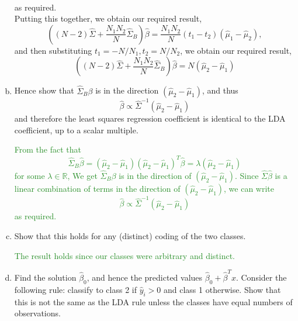 \documentclass{article}
\begin{document}
\begin{enumerate}[(a)]
{\begin{align*}
            \end{align*} as required.\\
            Putting this together, we obtain our required result, \[
                \left( (N-2) \hat \Sigma + \frac{N_1 N_2}{N} \hat \Sigma_B \right) \hat \beta = \frac{N_1 N_2}{N} (t_1 - t_2)(\hat \mu_1 - \hat \mu_2),
            \]
            and then substituting $t_1 = -N/N_1, t_2 = N/N_2$, we obtain our required result, \[
                \left( (N-2) \hat \Sigma + \frac{N_1 N_2}{N} \hat \Sigma_B \right) \hat \beta = N(\hat \mu_2 - \hat \mu_1)
            \]}
    \item
    Hence show that $\hat \Sigma_B \beta$ is in the direction $(\hat \mu_2 - \hat \mu_1)$, and thus \[
            \hat \beta \propto \hat \Sigma^{-1}(\hat \mu_2 - \hat \mu_1)
        \]
        and therefore the least squares regression coefficient is identical to the LDA coefficient, up to a scalar multiple.

    \textcolor{ForestGreen}{From the fact that \[
            \hat \Sigma_B \hat \beta = (\hat \mu_2 - \hat \mu_1)(\hat \mu_2 - \hat \mu_1)^T \hat \beta = \lambda (\hat \mu_2 - \hat \mu_1)
            \] for some $\lambda \in \mathbb{R}$,
    We get $\hat \Sigma_B \beta$ is in the direction of $(\hat \mu_2 - \hat \mu_1)$.
    Since $\hat \Sigma \hat \beta$ is a linear combination of terms in the direction of $(\hat \mu_2 - \hat \mu_1)$, we can write \[
                \hat \beta \propto \hat \Sigma^{-1} (\hat \mu_2 - \hat \mu_1)
    \] as required. }

    \item
    Show that this holds for any (distinct) coding of the two classes.

    \textcolor{ForestGreen}{The result holds since our classes were arbitrary and distinct.}

    \item
    Find the solution $\hat \beta_0$, and hence the predicted values $\hat \beta_0 + \hat \beta^T x$.  Consider the following rule: classify to class 2 if $\hat y_i > 0$ and class 1 otherwise.  Show that this is not the same as the LDA rule unless the classes have equal numbers of observations.


\end{enumerate}
\end{document}

